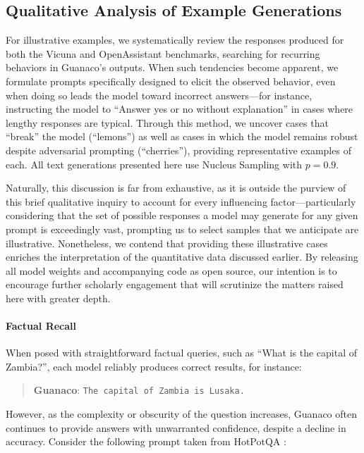 \subsection{Qualitative Analysis of Example Generations}
\label{ssec:examples}

For illustrative examples, we systematically review the responses produced for both the Vicuna and OpenAssistant benchmarks, searching for recurring behaviors in {Guanaco}'s outputs. When such tendencies become apparent, we formulate prompts specifically designed to elicit the observed behavior, even when doing so leads the model toward incorrect answers—for instance, instructing the model to ``Answer yes or no without explanation'' in cases where lengthy responses are typical. Through this method, we uncover cases that ``break'' the model (``lemons'') as well as cases in which the model remains robust despite adversarial prompting (``cherries''), providing representative examples of each. All text generations presented here use Nucleus Sampling \cite{holtzmancurious} with $p=0.9$.

Naturally, this discussion is far from exhaustive, as it is outside the purview of this brief qualitative inquiry to account for every influencing factor—particularly considering that the set of possible responses a model may generate for any given prompt is exceedingly vast, prompting us to select samples that we anticipate are illustrative. Nonetheless, we contend that providing these illustrative cases enriches the interpretation of the quantitative data discussed earlier. By releasing all model weights and accompanying code as open source, our intention is to encourage further scholarly engagement that will scrutinize the matters raised here with greater depth.

\paragraph{Factual Recall} When posed with straightforward factual queries, such as ``What is the capital of Zambia?'', each model reliably produces correct results, for instance:

\begin{quote} 
    \textbf{Guanaco}:
    \texttt{The capital of Zambia is Lusaka.}
\end{quote}

However, as the complexity or obscurity of the question increases, {Guanaco} often continues to provide answers with unwarranted confidence, despite a decline in accuracy. Consider the following prompt taken from HotPotQA \citep{yang2018hotpotqa}:


